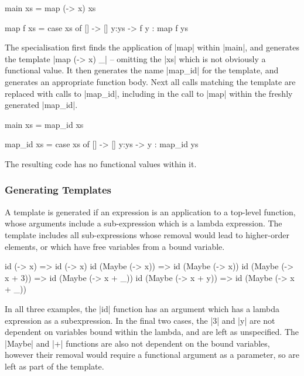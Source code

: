 \documentclass[preprint]{sigplanconf}
\begin{document}
\begin{example}
\begin{code}
main xs = map (\x -> x) xs

map f xs = case  xs of
                 []    -> []
                 y:ys  -> f y : map f ys
\end{code}

The specialisation first finds the application of |map| within |main|, and generates the template |map (\x -> x) _| -- omitting the |xs| which is not obviously a functional value. It then generates the name |map_id| for the template, and generates an appropriate function body. Next all calls matching the template are replaced with calls to |map_id|, including in the call to |map| within the freshly generated |map_id|.

\begin{code}
main xs = map_id xs

map_id xs = case  xs of
                  []    -> []
                  y:ys  -> y : map_id ys
\end{code}

The resulting code has no functional values within it.
\end{example}

\subsubsection{Generating Templates}

A template is generated if an expression is an application to a top-level function, whose arguments include a sub-expression which is a lambda expression. The template includes all sub-expressions whose removal would lead to higher-order elements, or which have free variables from a bound variable.

\begin{example}
\begin{code}
id (\x -> x)              => id (\x -> x)
id (Maybe (\x -> x))      => id (Maybe (\x -> x))
id (Maybe (\x -> x + 3))  => id (Maybe (\x -> x + _))
id (Maybe (\x -> x + y))  => id (Maybe (\x -> x + _))
\end{code}

In all three examples, the |id| function has an argument which has a lambda expression as a subexpression. In the final two cases, the |3| and |y| are not dependent on variables bound within the lambda, and are left as unspecified.  The |Maybe| and |+| functions are also not dependent on the bound variables, however their removal would require a functional argument as a parameter, so are left as part of the template.
\end{example}
\end{document}
